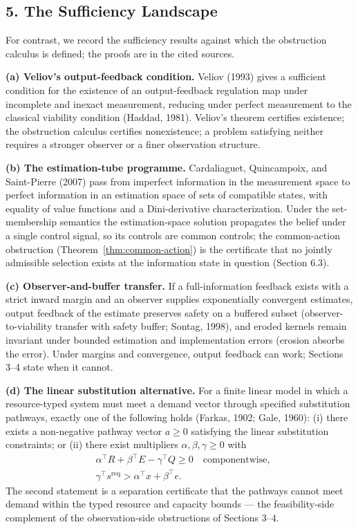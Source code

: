 \documentclass[10pt,twocolumn]{article}
\theoremstyle{definition}
\begin{document}
\subsection{5. The Sufficiency Landscape}\label{the-sufficiency-landscape-cited}

For contrast, we record the sufficiency results against which the obstruction calculus is defined; the proofs are in the cited sources.

\textbf{(a) Veliov's output-feedback condition.} Veliov (1993) gives a sufficient condition for the existence of an output-feedback regulation map under incomplete and inexact measurement, reducing under perfect measurement to the classical viability condition (Haddad, 1981). Veliov's theorem certifies existence; the obstruction calculus certifies nonexistence; a problem satisfying neither requires a stronger observer or a finer observation structure.

\textbf{(b) The estimation-tube programme.} Cardaliaguet, Quincampoix, and Saint-Pierre (2007) pass from imperfect information in the measurement space to perfect information in an estimation space of sets of compatible states, with equality of value functions and a Dini-derivative characterization. Under the set-membership semantics the estimation-space solution propagates the belief under a single control signal, so its controls are common controls; the common-action obstruction (Theorem~\ref{thm:common-action}) is the certificate that no jointly admissible selection exists at the information state in question (Section 6.3).

\textbf{(c) Observer-and-buffer transfer.} If a full-information feedback exists with a strict inward margin and an observer supplies exponentially convergent estimates, output feedback of the estimate preserves safety on a buffered subset (observer-to-viability transfer with safety buffer; Sontag, 1998), and eroded kernels remain invariant under bounded estimation and implementation errors (erosion absorbs the error). Under margins and convergence, output feedback can work; Sections 3--4 state when it cannot.

\textbf{(d) The linear substitution alternative.} For a finite linear model in which a resource-typed system must meet a demand vector through specified substitution pathways, exactly one of the following holds (Farkas, 1902; Gale, 1960): (i) there exists a non-negative pathway vector \(a \ge 0\) satisfying the linear substitution constraints; or (ii) there exist multipliers \(\alpha, \beta, \gamma \ge 0\) with
\[
\begin{aligned}
&\alpha^\top R + \beta^\top E - \gamma^\top Q \ge 0 \quad\text{componentwise},\\
&\gamma^\top s^{\mathrm{req}} > \alpha^\top x + \beta^\top e.
\end{aligned}
\]
The second statement is a separation certificate that the pathways cannot meet demand within the typed resource and capacity bounds --- the feasibility-side complement of the observation-side obstructions of Sections 3--4.
\end{document}
